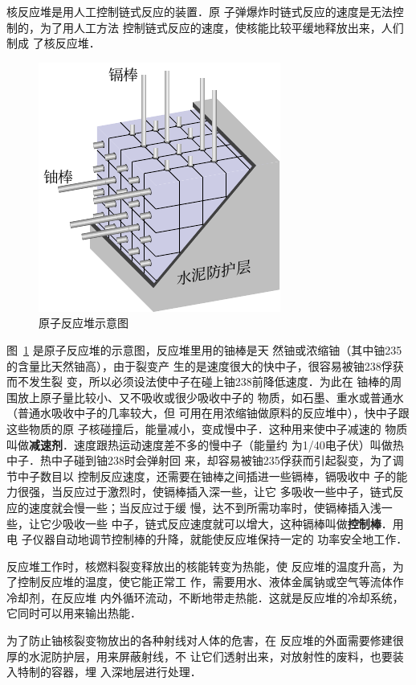 核反应堆是用人工控制链式反应的装置．原
子弹爆炸时链式反应的速度是无法控制的，为了用人工方法
控制链式反应的速度，使核能比较平缓地释放出来，人们制成
了核反应堆．
\begin{figure}[htbp]
    \centering
    \includegraphics{fig/C/9-14.pdf}
    \caption{原子反应堆示意图}\label{fig_C_9-14}
\end{figure}

图~\ref{fig_C_9-14} 是原子反应堆的示意图，反应堆里用的铀棒是天
然铀或浓缩铀（其中铀235的含量比天然铀高），由于裂变产
生的是速度很大的快中子，很容易被铀238俘获而不发生裂
变，所以必须设法使中子在碰上铀238前降低速度．为此在
铀棒的周围放上原子量比较小、又不吸收或很少吸收中子的
物质，如石墨、重水或普通水（普通水吸收中子的几率较大，但
可用在用浓缩铀做原料的反应堆中），快中子跟这些物质的原
子核碰撞后，能量减小，变成慢中子．这种用来使中子减速的
物质叫做\textbf{减速剂}．速度跟热运动速度差不多的慢中子（能量约
为1/40电子伏）叫做热中子．热中子碰到铀238时会弹射回
来，却容易被铀235俘获而引起裂变，为了调节中子数目以
控制反应速度，还需要在铀棒之间插进一些镉棒，镉吸收中
子的能力很强，当反应过于激烈时，使镉棒插入深一些，让它
多吸收一些中子，链式反应的速度就会慢一些；当反应过于缓
慢，达不到所需功率时，使镉棒插入浅一些，让它少吸收一些
中子，链式反应速度就可以增大，这种镉棒叫做\textbf{控制棒}．用电
子仪器自动地调节控制棒的升降，就能使反应堆保持一定的
功率安全地工作．

反应堆工作时，核燃料裂变释放出的核能转变为热能，使
反应堆的温度升高，为了控制反应堆的温度，使它能正常工
作，需要用水、液体金属钠或空气等流体作冷却剂，在反应堆
内外循环流动，不断地带走热能．这就是反应堆的冷却系统，
它同时可以用来输出热能．

为了防止铀核裂变物放出的各种射线对人体的危害，在
反应堆的外面需要修建很厚的水泥防护层，用来屏蔽射线，不
让它们透射出来，对放射性的废料，也要装入特制的容器，埋
入深地层进行处理．

